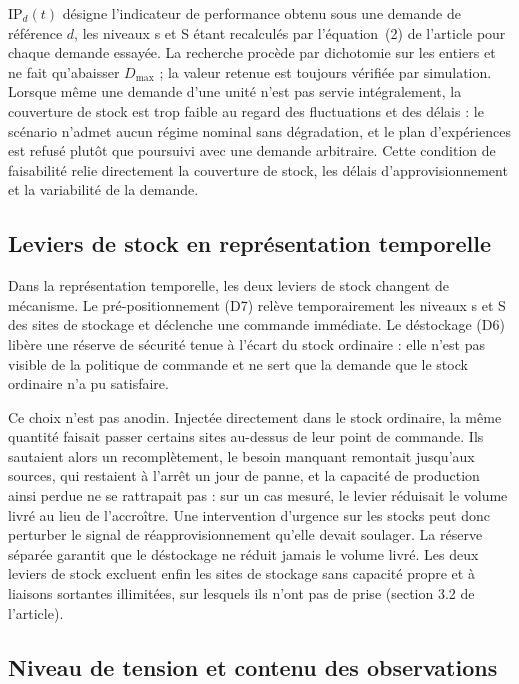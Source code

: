 $\mathrm{IP}_{d}(t)$ désigne l'indicateur de performance obtenu sous une demande de référence $d$, les niveaux s et S étant recalculés par l'équation~(2) de l'article pour chaque demande essayée. La recherche procède par dichotomie sur les entiers et ne fait qu'abaisser $D_{\mathrm{max}}$ ; la valeur retenue est toujours vérifiée par simulation. Lorsque même une demande d'une unité n'est pas servie intégralement, la couverture de stock est trop faible au regard des fluctuations et des délais : le scénario n'admet aucun régime nominal sans dégradation, et le plan d'expériences est refusé plutôt que poursuivi avec une demande arbitraire. Cette condition de faisabilité relie directement la couverture de stock, les délais d'approvisionnement et la variabilité de la demande.

\subsection*{Leviers de stock en représentation temporelle}

Dans la représentation temporelle, les deux leviers de stock changent de mécanisme. Le pré-positionnement (D7) relève temporairement les niveaux s et S des sites de stockage et déclenche une commande immédiate. Le déstockage (D6) libère une réserve de sécurité tenue à l'écart du stock ordinaire : elle n'est pas visible de la politique de commande et ne sert que la demande que le stock ordinaire n'a pu satisfaire.

Ce choix n'est pas anodin. Injectée directement dans le stock ordinaire, la même quantité faisait passer certains sites au-dessus de leur point de commande. Ils sautaient alors un recomplètement, le besoin manquant remontait jusqu'aux sources, qui restaient à l'arrêt un jour de panne, et la capacité de production ainsi perdue ne se rattrapait pas : sur un cas mesuré, le levier réduisait le volume livré au lieu de l'accroître. Une intervention d'urgence sur les stocks peut donc perturber le signal de réapprovisionnement qu'elle devait soulager. La réserve séparée garantit que le déstockage ne réduit jamais le volume livré. Les deux leviers de stock excluent enfin les sites de stockage sans capacité propre et à liaisons sortantes illimitées, sur lesquels ils n'ont pas de prise (section 3.2 de l'article).

\subsection*{Niveau de tension et contenu des observations}

